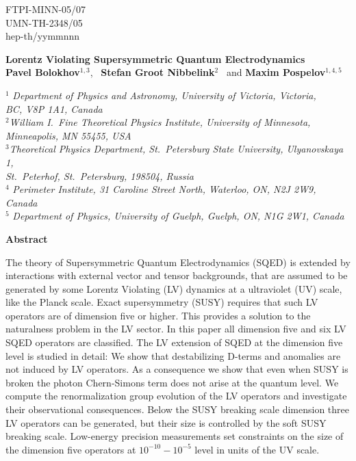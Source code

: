 \documentclass[12pt]{revtex4}
\begin{document}
\begin{titlepage}
\renewcommand{\thefootnote}{\fnsymbol{footnote}}

\begin{flushright}
FTPI-MINN-05/07\\
UMN-TH-2348/05\\
hep-th/yymmnnn
\end{flushright}
\vskip -1cm
\begin{center}
\vspace{0.5cm}

\large {\bf Lorentz Violating Supersymmetric Quantum Electrodynamics}\\[3mm] 
  
\vspace*{0.5cm}
\normalsize
{\bf Pavel Bolokhov}$^{1,3}$, ~{\bf Stefan Groot Nibbelink}$^{2}$
\ and
{\bf Maxim Pospelov}$^{1,4,5}$%

\vspace*{0.5cm}
$^{1}$ {\it Department of Physics and Astronomy,
University of Victoria, Victoria,\\ BC, V8P 1A1, Canada}\\
$^{2}${\it William I.\ Fine Theoretical Physics Institute,
University of Minnesota,\\ Minneapolis, MN 55455, USA}\\
$^{3}${\it Theoretical Physics Department, 
St.\ Petersburg State University, Ulyanovskaya 1,\\
St.\ Peterhof, St.\ Petersburg, 198504, Russia}\\
$^{4}$ {\it Perimeter Institute, 31 Caroline Street North,
Waterloo, ON,  N2J 2W9,
Canada}\\
$^{5}$ {\it Department of Physics,
 University of Guelph,
 Guelph, ON,  N1G 2W1, Canada}
 \end{center}

\centerline{\large\bf Abstract}

The theory of Supersymmetric Quantum Electrodynamics (SQED) is extended by 
interactions with external vector and tensor backgrounds, that are 
assumed to be generated by some Lorentz Violating (LV) dynamics at a 
ultraviolet (UV) scale, like the Planck scale. Exact supersymmetry
(SUSY) requires that such LV operators are of dimension five or 
higher. This provides a solution to the naturalness problem in the 
LV sector. In this paper all dimension five and six LV SQED operators
are classified. The LV extension of SQED at the dimension five level 
is studied in detail: We show that destabilizing D-terms and anomalies
are not induced by LV operators. As a consequence we show
that even when SUSY is broken the photon Chern-Simons term does not
arise at the quantum level. We compute the renormalization group
evolution of the LV operators and investigate their observational
consequences. Below the SUSY breaking scale dimension three LV
operators can be generated, but their size is controlled by the soft
SUSY breaking scale. Low-energy precision measurements set constraints
on the size of the dimension five operators at $10^{-10}-10^{-5}$
level in units of the UV scale.  





\end{titlepage}
\end{document}
